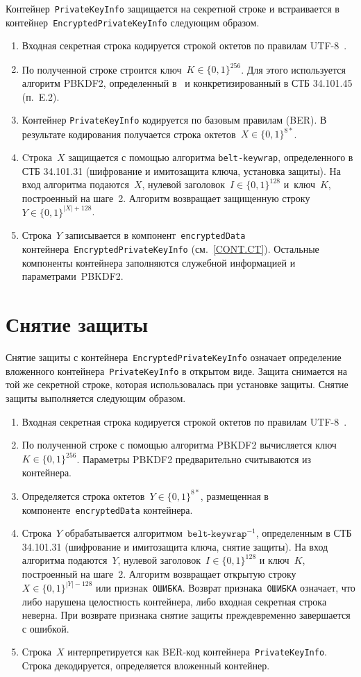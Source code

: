 Контейнер~\texttt{PrivateKeyInfo} защищается на секретной строке и
встраивается в контейнер~\texttt{EncryptedPrivateKeyInfo} следующим
образом.
\begin{enumerate}
\item
Входная секретная строка кодируется строкой октетов по правилам 
UTF-8~\cite{UTF8}. 
\item
По полученной строке строится ключ~$K\in\{0,1\}^{256}$.
Для этого используется алгоритм PBKDF2, определенный в~\cite{PKCS5} и 
конкретизированный в СТБ 34.101.45 (п.~E.2).
\item
Контейнер \texttt{PrivateKeyInfo} кодируется по базовым правилам (BER).
В результате кодирования получается строка октетов~$X\in\{0,1\}^{8*}$.
\item
Cтрока~$X$ защищается с помощью алгоритма \texttt{belt-keywrap}, 
определенного в СТБ 34.101.31 (шифрование и имитозащита ключа, 
установка защиты). На вход алгоритма подаются~$X$, нулевой 
заголовок~$I\in\{0,1\}^{128}$ и~ключ~$K$, построенный на шаге~2. Алгоритм 
возвращает защищенную строку~$Y\in\{0,1\}^{|X|+128}$. 
\item
Строка~$Y$ записывается в компонент~\texttt{encryptedData}
контейнера~\texttt{EncryptedPrivateKeyInfo} (см.~\ref{CONT.CT}).
Остальные компоненты контейнера
заполняются служебной информацией и параметрами~PBKDF2.
\end{enumerate}

\section{Снятие защиты}\label{CONT.Unwrap}

Снятие защиты с контейнера~\texttt{EncryptedPrivateKeyInfo} 
означает определение вложенного контейнера~\texttt{PrivateKeyInfo} 
в открытом виде. Защита снимается на той же секретной строке, которая 
использовалась при установке защиты. 
Снятие защиты выполняется следующим образом.
\begin{enumerate}
\item
Входная секретная строка кодируется строкой октетов по правилам  
UTF-8~\cite{UTF8}. 
\item
По полученной строке с помощью алгоритма PBKDF2
вычисляется ключ~$K\in\{0,1\}^{256}$.
Параметры PBKDF2 предварительно считываются из контейнера.
\item
Определяется строка октетов~$Y\in\{0,1\}^{8*}$, размещенная в 
компоненте~\texttt{encryptedData} контейнера. 
\item
Строка~$Y$ обрабатывается алгоритмом~$\texttt{belt-keywrap}^{-1}$, определенным 
в СТБ 34.101.31 (шифрование и имитозащита ключа, снятие защиты). 
На вход алгоритма подаются~$Y$, нулевой заголовок~$I\in\{0,1\}^{128}$ и 
ключ~$K$, построенный на шаге~$2$. 
%
Алгоритм возвращает открытую строку~$X\in\{0,1\}^{|Y|-128}$ или 
признак~\texttt{ОШИБКА}.
%
Возврат признака~\texttt{ОШИБКА} означает, что либо нарушена целостность
контейнера, либо входная секретная строка неверна. При возврате признака
снятие защиты преждевременно завершается с ошибкой.
\item
Строка~$X$ интерпретируется как BER-код 
контейнера~\texttt{PrivateKeyInfo}. Строка декодируется, определяется 
вложенный контейнер. 
\end{enumerate}

